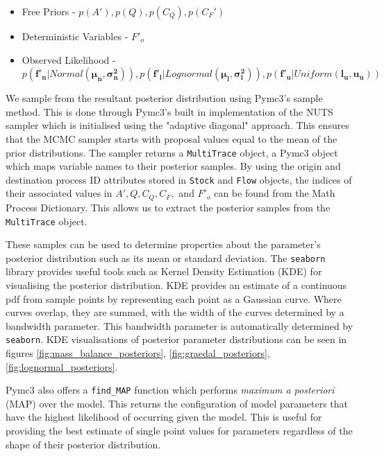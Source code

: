\documentclass[ %
                    author={Tom Jager},
                supervisor={Dr. Daniel Schien},
                    degree={MEng},
                     title={A Bayesian Inference Engine for Calibrating Uncertainty over UMIS Structured MFA Systems},
                  subtitle={},
                      type={research},
                      year={2019} ]{dissertation}
\begin{document}
\begin{itemize}
    \item Free Priors - $p(A'), p(Q), p(C_Q), p(C_F')$
    \item Deterministic Variables - $F'_o$
    \item Observed Likelihood - $ p(\bm{f'_n} | Normal(\bm{\mu_n}, \bm{\sigma_n^2})), p(\bm{f'_l} | Lognormal(\bm{\mu_l}, \bm{\sigma_l^2})), p(\bm{f'_u} | Uniform(\bm{l_u}, \bm{u_u})) $
\end{itemize}
We sample from the resultant posterior distribution using Pymc3's sample method. This is done through Pymc3's built in implementation of the NUTS sampler which is initialised using the "adaptive diagonal" approach. This ensures that the MCMC sampler starts with proposal values equal to the mean of the prior distributions. The sampler returns a \texttt{MultiTrace} object, a Pymc3 object which maps variable names to their posterior samples. By using the origin and destination process ID attributes stored in \texttt{Stock} and \texttt{Flow} objects, the indices of their associated values in $A', Q, C_Q, C_F,$ and $F'_o$ can be found from the Math Process Dictionary. This allows us to extract the posterior samples from the \texttt{MultiTrace} object.

These samples can be used to determine properties about the parameter's posterior distribution such as its mean or standard deviation. The \texttt{seaborn} library provides useful tools such as Kernel Density Estimation (KDE) \cite{kde} for visualising the posterior distribution. KDE provides an estimate of a continuous pdf from sample points by representing each point as a Gaussian curve. Where curves overlap, they are summed, with the width of the curves determined by a bandwidth parameter. This bandwidth parameter is automatically determined by \texttt{seaborn}. KDE visualisations of posterior parameter distributions can be seen in figures \ref{fig:mass_balance_posteriors}, \ref{fig:graedal_posteriors}, \ref{fig:lognormal_posteriors}.

Pymc3 also offers a \texttt{find\_MAP} function which performs \textit{maximum a posteriori} (MAP) over the model. This returns the configuration of model parameters that have the highest likelihood of occurring given the model. This is useful for providing the best estimate of single point values for parameters regardless of the shape of their posterior distribution.

\end{document}
